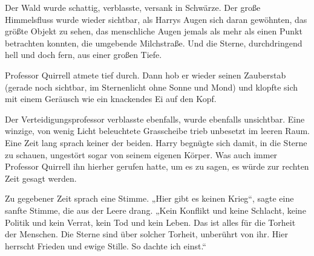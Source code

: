 
Der Wald wurde schattig, verblasste, versank in Schwärze. Der große Himmelsfluss wurde wieder sichtbar, als Harrys Augen sich daran gewöhnten, das größte Objekt zu sehen, das menschliche Augen jemals als mehr als einen Punkt betrachten konnten, die umgebende Milchstraße. Und die Sterne, durchdringend hell und doch fern, aus einer großen Tiefe.

Professor Quirrell atmete tief durch. Dann hob er wieder seinen Zauberstab (gerade noch sichtbar, im Sternenlicht ohne Sonne und Mond) und klopfte sich mit einem Geräusch wie ein knackendes Ei auf den Kopf.



Der Verteidigungsprofessor verblasste ebenfalls, wurde ebenfalls unsichtbar. Eine winzige, von wenig Licht beleuchtete Grasscheibe trieb unbesetzt im leeren Raum. Eine Zeit lang sprach keiner der beiden. Harry begnügte sich damit, in die Sterne zu schauen, ungestört sogar von seinem eigenen Körper. Was auch immer Professor Quirrell ihn hierher gerufen hatte, um es zu sagen, es würde zur rechten Zeit gesagt werden.


Zu gegebener Zeit sprach eine Stimme.
„Hier gibt es keinen Krieg“, sagte eine sanfte Stimme, die aus der Leere drang.
„Kein Konflikt und keine Schlacht, keine Politik und kein Verrat, kein Tod und kein Leben. Das ist alles für die Torheit der Menschen. Die Sterne sind über solcher Torheit, unberührt von ihr. Hier herrscht Frieden und ewige Stille. So dachte ich einst.“


